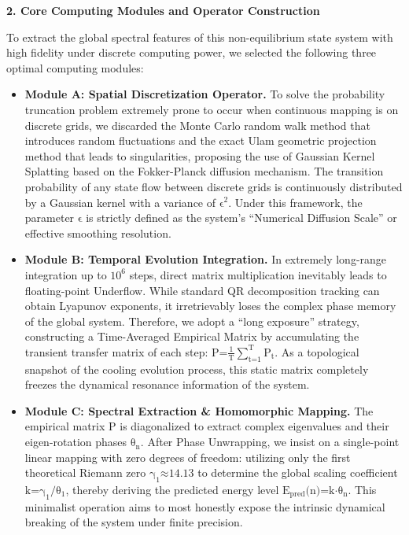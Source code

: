 \textbf{2. Core Computing Modules and Operator Construction}

To extract the global spectral features of this non-equilibrium state
system with high fidelity under discrete computing power, we selected
the following three optimal computing modules:

\begin{itemize}
\item
  \textbf{Module A: Spatial Discretization Operator.} To solve the
  probability truncation problem extremely prone to occur when
  continuous mapping is on discrete grids, we discarded the Monte Carlo
  random walk method that introduces random fluctuations and the exact
  Ulam geometric projection method that leads to singularities,
  proposing the use of Gaussian Kernel Splatting based on the
  Fokker-Planck diffusion mechanism. The transition probability of any
  state flow between discrete grids is continuously distributed by a
  Gaussian kernel with a variance of \(\text{ϵ}^{\text{2}}\). Under this
  framework, the parameter \(\text{ϵ}\) is strictly defined as the
  system's ``Numerical Diffusion Scale'' or effective smoothing
  resolution.
\item
  \textbf{Module B: Temporal Evolution Integration.} In extremely
  long-range integration up to \(\text{10}^{\text{6}}\) steps, direct
  matrix multiplication inevitably leads to floating-point Underflow.
  While standard QR decomposition tracking can obtain Lyapunov
  exponents, it irretrievably loses the complex phase memory of the
  global system. Therefore, we adopt a ``long exposure'' strategy,
  constructing a Time-Averaged Empirical Matrix by accumulating the
  transient transfer matrix of each step:
  \(\text{P}\text{=}\frac{\text{1}}{\text{T}}\sum_{\text{t}\text{=1}}^{\text{T}}\text{P}_{\text{t}}\).
  As a topological snapshot of the cooling evolution process, this
  static matrix completely freezes the dynamical resonance information
  of the system.
\item
  \textbf{Module C: Spectral Extraction \& Homomorphic Mapping.} The
  empirical matrix \(\text{P}\) is diagonalized to extract complex
  eigenvalues and their eigen-rotation phases \(\text{θ}_{\text{n}}\).
  After Phase Unwrapping, we insist on a single-point linear mapping
  with zero degrees of freedom: utilizing only the first theoretical
  Riemann zero \(\text{γ}_{\text{1}}\text{≈14.13}\) to determine the
  global scaling coefficient
  \(\text{k}\text{=}\text{γ}_{\text{1}}\text{/}\text{θ}_{\text{1}}\),
  thereby deriving the predicted energy level
  \(\text{E}_{\text{pred}}\text{(}\text{n}\text{)=}\text{k}\text{⋅}\text{θ}_{\text{n}}\).
  This minimalist operation aims to most honestly expose the intrinsic
  dynamical breaking of the system under finite precision.
\end{itemize}

